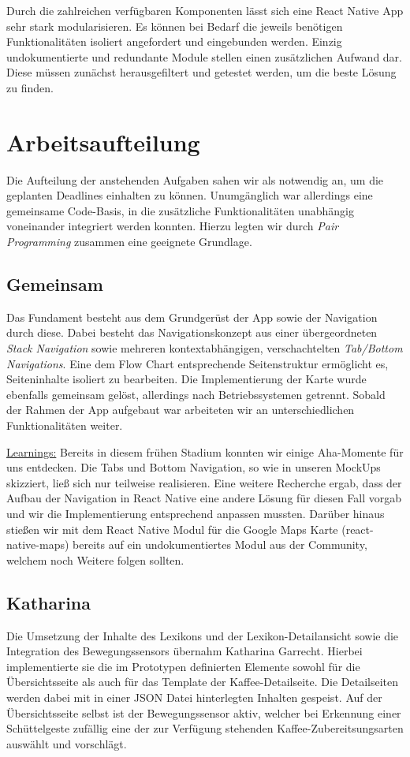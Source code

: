 Durch die zahlreichen verfügbaren Komponenten lässt sich eine React Native App sehr stark modularisieren.
Es können bei Bedarf die jeweils benötigen Funktionalitäten isoliert angefordert und eingebunden werden.
Einzig undokumentierte und redundante Module stellen einen zusätzlichen Aufwand dar.
Diese müssen zunächst herausgefiltert und getestet werden, um die beste Lösung zu finden.

\section{Arbeitsaufteilung}
Die Aufteilung der anstehenden Aufgaben sahen wir als notwendig an, um die geplanten Deadlines einhalten zu können.
Unumgänglich war allerdings eine gemeinsame Code-Basis, in die zusätzliche Funktionalitäten unabhängig voneinander integriert werden konnten.
Hierzu legten wir durch \emph{Pair Programming} zusammen eine geeignete Grundlage.

\subsection{Gemeinsam}
Das Fundament besteht aus dem Grundgerüst der App sowie der Navigation durch diese.
Dabei besteht das Navigationskonzept aus einer übergeordneten \emph{Stack Navigation} sowie mehreren kontextabhängigen, verschachtelten \emph{Tab/Bottom Navigations}.
Eine dem Flow Chart entsprechende Seitenstruktur ermöglicht es, Seiteninhalte isoliert zu bearbeiten.
Die Implementierung der Karte wurde ebenfalls gemeinsam gelöst, allerdings nach Betriebssystemen getrennt.
Sobald der Rahmen der App aufgebaut war arbeiteten wir an unterschiedlichen Funktionalitäten weiter.

\underline{Learnings:}
Bereits in diesem frühen Stadium konnten wir einige Aha-Momente für uns entdecken.
Die Tabs und Bottom Navigation, so wie in unseren MockUps skizziert, ließ sich nur teilweise realisieren.
Eine weitere Recherche ergab, dass der Aufbau der Navigation in React Native eine andere Lösung für diesen Fall vorgab und wir die Implementierung entsprechend anpassen mussten.
Darüber hinaus stießen wir mit dem React Native Modul für die Google Maps Karte (react-native-maps) bereits auf ein undokumentiertes Modul aus der Community, welchem noch Weitere folgen sollten.

\subsection{Katharina}
Die Umsetzung der Inhalte des Lexikons und der Lexikon-Detailansicht sowie die Integration des Bewegungssensors übernahm Katharina Garrecht.
Hierbei implementierte sie die im Prototypen definierten Elemente sowohl für die Übersichtsseite als auch für das Template der Kaffee-Detailseite.
Die Detailseiten werden dabei mit in einer JSON Datei hinterlegten Inhalten gespeist.
Auf der Übersichtsseite selbst ist der Bewegungssensor aktiv, welcher bei Erkennung einer Schüttelgeste zufällig eine der zur Verfügung stehenden Kaffee-Zubereitsungsarten auswählt und vorschlägt.

